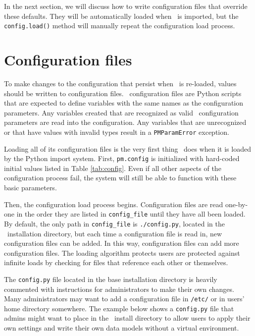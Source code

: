 In the next section, we will discuss how to write configuration files that override these defaults.  They will be automatically loaded when \PM\ is imported, but the \verb|config.load()| method will manually repeat the configuration load process.

\section{Configuration files}

To make changes to the configuration that persist when \PM\ is re-loaded, values should be written to configuration files.  \PM\ configuration files are Python scripts that are expected to define variables with the same names as the configuration parameters.  Any variables created that are recognized as valid \PM\ configuration parameters are read into the configuration.  Any variables that are unrecognized or that have values with invalid types result in a \texttt{PMParamError} exception.

Loading all of its configuration files is the very first thing \PM\ does when it is loaded by the Python import system.  First, \texttt{pm.config} is initialized with hard-coded initial values listed in Table \ref{tab:config}.  Even if all other aspects of the configuration process fail, the system will still be able to function with these basic parameters. 

Then, the configuration load process begins.  Configuration files are read one-by-one in the order they are listed in \verb|config_file| until they have all been loaded.  By default, the only path in \verb|config_file| is \texttt{./config.py}, located in the \PM\ installation directory, but each time a configuration file is read in, new configuration files can be added.  In this way, configuration files can add more configuration files.  The loading algorithm protects users are protected against infinite loads by checking for files that reference each other or themselves.

The \texttt{config.py} file located in the base installation directory is heavily commented with instructions for administrators to make their own changes.  Many administrators may want to add a configuration file in \texttt{/etc/} or in users' home directory somewhere.  The example below shows a \texttt{config.py} file that admins might want to place in the \PM\ install directory to allow users to apply their own settings and write their own data models without a virtual environment.

